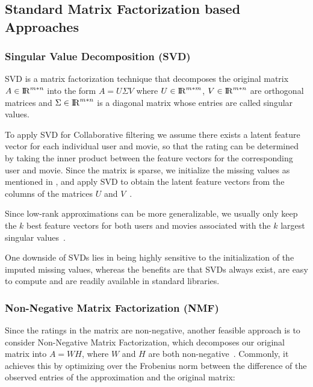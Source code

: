 \documentclass[10pt,conference,compsocconf]{IEEEtran}
\begin{document}
    \subsection{Standard Matrix Factorization based Approaches}

    \subsubsection{Singular Value Decomposition (SVD)}

    SVD is a matrix factorization technique that decomposes the original matrix $A \in {\rm I\!R}^{m*n} $ into the form $ A = U \Sigma V $ where $U \in {\rm I\!R}^{m*m}$,  $V  \in {\rm I\!R}^{m*n}$ are orthogonal matrices and $\Sigma \in {\rm I\!R}^{m*n}$ is a diagonal matrix whose entries are called singular values.

    To apply SVD for Collaborative filtering we assume there exists a latent feature vector for each individual user and movie, so that the rating can be determined by taking the inner product between the feature vectors for the corresponding user and movie.
    Since the matrix is sparse, we initialize the missing values as mentioned in , and apply SVD to obtain the latent feature vectors from the columns of the matrices $U$ and $V$~\cite{svd}.

    Since low-rank approximations can be more generalizable, we usually only keep the $k$ best feature vectors for both users and movies associated with the $k$ largest singular values~\cite{Eckart1936}.%

    One downside of SVDs lies in being highly sensitive to the initialization of the imputed missing values, whereas the benefits are that SVDs always exist, are easy to compute and are readily available in standard libraries.

    \subsubsection{Non-Negative Matrix Factorization (NMF)}

    Since the ratings in the matrix are non-negative, another feasible approach is to consider Non-Negative Matrix Factorization, which decomposes our original matrix into $A = WH$, where $W$ and $H$ are both non-negative~\cite{gillis2014nonnegative}.
    Commonly, it achieves this by optimizing over the Frobenius norm between the difference of the observed entries of the approximation and the original matrix:
\end{document}
